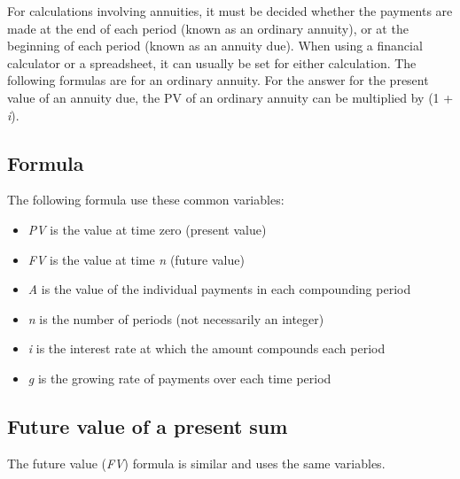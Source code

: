 For calculations involving annuities, it must be decided whether the payments are made at
the end of each period (known as an ordinary annuity), or at the beginning of each period
(known as an annuity due). When using a financial calculator or a spreadsheet, it can
usually be set for either calculation. The following formulas are for an ordinary annuity.
For the answer for the present value of an annuity due, the PV of an ordinary annuity can
be multiplied by (1 + \textit{i}).




\subsection{Formula}
\label{sss:form-35be}




The following formula use these common variables:



\begin{itemize}
    \item \textit{PV} is the value at time zero (present value)
    \item \textit{FV} is the value at time \textit{n} (future value)
    \item \textit{A} is the value of the individual payments in each compounding period
    \item \textit{n} is the number of periods (not necessarily an integer)
    \item \textit{i} is the interest rate at which the amount compounds each period
    \item \textit{g} is the growing rate of payments over each time period
\end{itemize}


\subsection{Future value of a present sum}
\label{sss:futu-951d}




The future value (\textit{FV}) formula is similar and uses the same variables.



